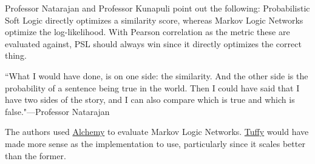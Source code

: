 \documentclass[letterpaper]{article}
\begin{document}
Professor Natarajan and Professor Kunapuli point out the following: Probabilistic Soft Logic directly optimizes a similarity score, whereas Markov Logic Networks optimize the log-likelihood. With Pearson correlation as the metric these are evaluated against, PSL should always win since it directly optimizes the correct thing.

``What I would have done, is on one side: the similarity. And the other side is the probability of a sentence being true in the world. Then I could have said that I have two sides of the story, and I can also compare which is true and which is false."---Professor Natarajan

The authors used \href{https://alchemy.cs.washington.edu/}{Alchemy} to evaluate Markov Logic Networks. \href{http://i.stanford.edu/hazy/tuffy/}{Tuffy} would have made more sense as the implementation to use, particularly since it scales better than the former.
\end{document}
